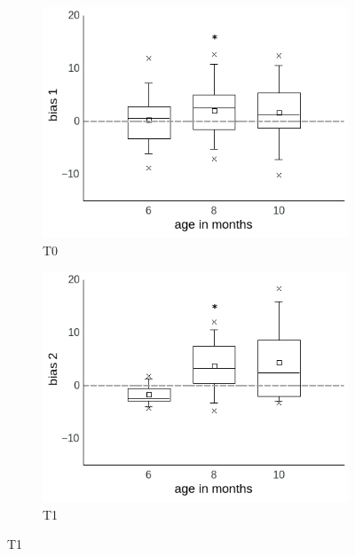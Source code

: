 \documentclass[a4paper]{scrreprt}
\begin{document}
\begin{figure}
\centering
    \begin{subfigure}[b]{0.49\textwidth}
        \includegraphics[width=\textwidth]{figs/sec3/age/age_diff1_dat.jpeg}
        \caption{T0}
    \end{subfigure}
\begin{subfigure}[b]{0.49\textwidth}
        \includegraphics[width=\textwidth]{figs/sec3/age/age_diff2_dat.jpeg}
        \caption{T1}
    \end{subfigure}
    

\end{figure}
\end{document}

